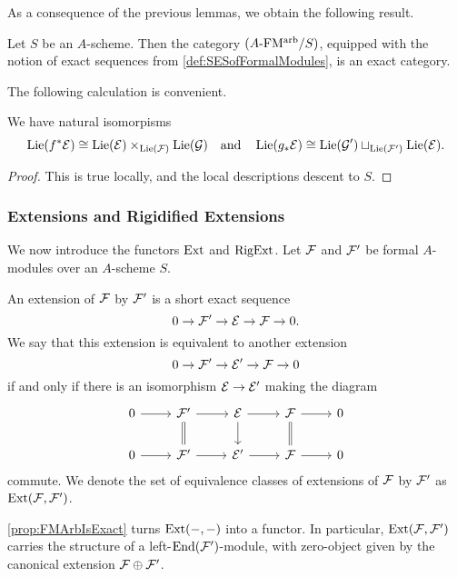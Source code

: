 \documentclass[../main.tex]{subfiles}
\begin{document}
As a consequence of the previous lemmas, we obtain the following result.
\begin{prop}\label{prop:FMArbIsExact}
  Let $S$ be an $A$-scheme. Then
  the category ${({A}\textnormal-\allowbreak\mathrm{FM^{arb}}/{S})}$, equipped with the notion of exact sequences
  from \cref{def:SESofFormalModules}, is an exact category. 
\end{prop}

The following calculation is convenient.
\begin{lem}%
  We have natural isomorpisms 
  \begin{equation*}
    \operatorname{Lie}(f^* \mathcal{E}) \cong \operatorname{Lie}(\mathcal{E}) \times_{\operatorname{Lie}(\mathcal{F})} \operatorname{Lie}(\mathcal{G}) \quad \text{and}
    \quad \operatorname{Lie}(g_* \mathcal{E}) \cong \operatorname{Lie}(\mathcal{G}') \sqcup_{\operatorname{Lie}(\mathcal{F}')} \operatorname{Lie}(\mathcal{E}).
  \end{equation*}
\begin{proof}
  This is true locally, and the local descriptions descent to $S$.
\end{proof}
\end{lem}


\subsubsection{Extensions and Rigidified Extensions} %
\label{ssub:Extensions and Rigidified Extensions}
We now introduce the functors $\operatorname{Ext}$ and $\operatorname {RigExt}$. 
Let $\mathcal{F}$ and $\mathcal{F}'$ be formal $A$-modules over an $A$-scheme $S$.
\begin{defi}[Extension]
  An extension of $\mathcal{F}$ by $\mathcal{F}'$ is a short exact sequence 
  \begin{equation*}
    0 \to \mathcal{F}' \to \mathcal{E} \to \mathcal{F} \to 0.
  \end{equation*}
  We say that this extension is equivalent to another extension 
  \begin{equation*}
    0 \to \mathcal{F}' \to \mathcal{E}' \to \mathcal{F} \to 0
  \end{equation*}
  if and only if there is an isomorphism $\mathcal{E} \to \mathcal{E}'$ making the diagram 
  \begin{equation*}
    \begin{tikzcd}[ampersand replacement=\&]
    	0 \& {\cF'} \& \cE \& \cF \& 0 \\
    	0 \& {\cF'} \& {\cE'} \& \cF \& 0
    	\arrow[from=1-1, to=1-2]
    	\arrow[from=1-2, to=1-3]
    	\arrow[Rightarrow, no head, from=1-2, to=2-2]
    	\arrow[from=1-3, to=1-4]
    	\arrow[from=1-3, to=2-3]
    	\arrow[from=1-4, to=1-5]
    	\arrow[Rightarrow, no head, from=1-4, to=2-4]
    	\arrow[from=2-1, to=2-2]
    	\arrow[from=2-2, to=2-3]
    	\arrow[from=2-3, to=2-4]
    	\arrow[from=2-4, to=2-5]
    \end{tikzcd}
  \end{equation*}
  commute. We denote the set of equivalence classes of extensions of $\mathcal{F}$ by
  $\mathcal{F}'$ as $\operatorname{Ext}(\mathcal{F}, \mathcal{F}')$. 
\end{defi}
\cref{prop:FMArbIsExact} turns $\operatorname{Ext}(-,-)$ into a functor.
In particular, $\operatorname{Ext}(\mathcal{F},\mathcal{F}')$ carries the structure of a
left-$\operatorname{End}(\mathcal{F}')$-module,
with zero-object given by the canonical extension $\mathcal{F} \oplus \mathcal{F}'$.
\end{document}
